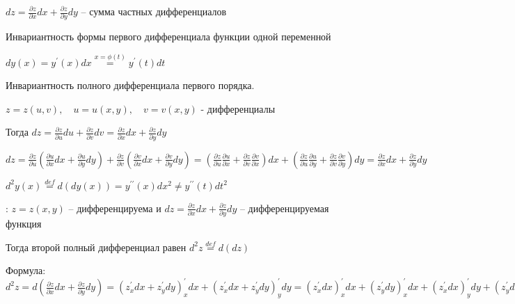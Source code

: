 \documentclass[12pt]{article}
\begin{document}
    $\displaystyle dz = \frac{\partial z}{\partial x} dx + \frac{\partial z}{\partial y} dy$ -- сумма частных дифференциалов

     Инвариантность формы первого дифференциала функции одной переменной

    $\displaystyle dy(x) = y^\prime(x)dx \stackrel{x = \phi(t)}{=} y^\prime(t)dt$

    \hypertarget{invariantofdifferentialoffunctionoftwovariables}{}
    \begin{MyTheorem}
        \Ths Инвариантность полного дифференциала первого порядка.

        $\displaystyle z = z(u, v), \quad u = u(x, y), \quad v = v(x, y)$ - дифференциалы

        Тогда $\displaystyle dz = \frac{\partial z}{\partial u}du + \frac{\partial z}{\partial v} dv = \frac{\partial z}{\partial x} dx + \frac{\partial z}{\partial y} dy$
    \end{MyTheorem}

    \begin{MyProof}
        $\displaystyle dz = \frac{\partial z}{\partial u} \left(\frac{\partial u}{\partial x} dx + \frac{\partial u}{\partial y} dy\right) +
        \frac{\partial z}{\partial v} \left(\frac{\partial v}{\partial x} dx + \frac{\partial v}{\partial y} dy\right) =
        \left(\frac{\partial z}{\partial u} \frac{\partial u}{\partial x} + \frac{\partial z}{\partial v} \frac{\partial v}{\partial x}\right) dx +
        \left(\frac{\partial z}{\partial u} \frac{\partial u}{\partial y} + \frac{\partial z}{\partial v} \frac{\partial v}{\partial y}\right) dy =
        \frac{\partial z}{\partial x} dx + \frac{\partial z}{\partial y} dy$
    \end{MyProof}


    \Mem $\displaystyle d^2 y(x) \stackrel{def}{=} d(dy(x)) = y^{\prime\prime}(x) dx^2 \neq y^{\prime\prime}(t) dt^2$
    
    \Def: $\displaystyle z = z(x, y)$ -- дифференцируема и $\displaystyle dz = \frac{\partial z}{\partial x}dx + \frac{\partial z}{\partial y}dy$ -- дифференцируемая функция

    \hypertarget{seconddifferentialoffunctionoftwovariables}{}

    Тогда второй полный дифференциал равен $\displaystyle d^2 z \stackrel{def}{=} d(dz)$

    Формула: $\displaystyle d^2 z = d\left(\frac{\partial z}{\partial x}dx + \frac{\partial z}{\partial y}dy\right) = (z^\prime_x dx + z^\prime_y dy)^\prime_x dx + (z^\prime_x dx + z^\prime_y dy)^\prime_y dy =
    (z^\prime_x dx)^\prime_x dx + (z^\prime_y dy)^\prime_x dx + (z^\prime_x dx)^\prime_y dy + (z^\prime_y dy)^\prime_y dy =
    (z^\prime_x)^\prime_x (dx)^2 + (z^\prime_y)^\prime_x dxdy + (z^\prime_x)^\prime_y dydx + (z^\prime_y)^\prime_y (dy)^2 =
    \frac{\partial^2 z}{\partial x^2} (dx)^2 + 2 \frac{\partial^2 z}{\partial x \partial y} dxdy + \frac{\partial^2 z}{\partial y^2} (dy)^2$
\end{document}
